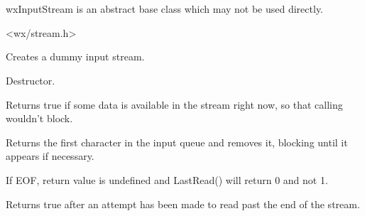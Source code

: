 \section{}\label{wxinputstream}

wxInputStream is an abstract base class which may not be used directly.




<wx/stream.h>




\label{wxinputstreamctor}


Creates a dummy input stream.

\label{wxinputstreamdtor}


Destructor.

\label{wxinputstreamcanread}


Returns true if some data is available in the stream right now, so that
calling  wouldn't block.

\label{wxinputstreamgetc}


Returns the first character in the input queue and removes it, 
blocking until it appears if necessary.


If EOF, return value is undefined and LastRead() will return 0 and not 1.

\label{wxinputstreameof}


Returns true after an attempt has been made to read past the end of the
stream.

